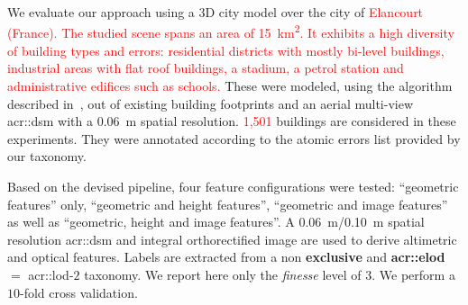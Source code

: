 \documentclass[conference]{IEEEtran}
\begin{document}
We evaluate our approach using a 3D city model over the city of \textcolor{red}{Elancourt (France). The studied scene spans an area of \SI{15}{\km\squared}. It exhibits a high diversity of building types and errors: residential districts with mostly bi-level buildings, industrial areas with flat roof buildings, a stadium, a petrol station and administrative edifices such as schools.} These were modeled, using the algorithm described in~\cite{Durupt2006}, out of existing building footprints and an aerial multi-view \acrshort{acr::dsm} with a \SI{0.06}{\m} spatial resolution. \textcolor{red}{1,501} buildings are considered in these experiments. They were annotated according to the atomic errors list provided by our taxonomy.

Based on the devised pipeline, four feature configurations were tested: ``geometric features'' only, ``geometric and height features'', ``geometric and image features'' as well as ``geometric, height and image features''. A \SI{0.06}{\m}/\SI{0.10}{\m} spatial resolution \acrshort{acr::dsm} and integral orthorectified image are used to derive altimetric and optical features. Labels are extracted from a non \textbf{exclusive} and \textbf{\acrshort{acr::elod}} $=$ \acrshort{acr::lod}-$2$ taxonomy. We report here only the \textit{finesse} level of $3$. We perform a $10$-fold cross validation.
\end{document}
